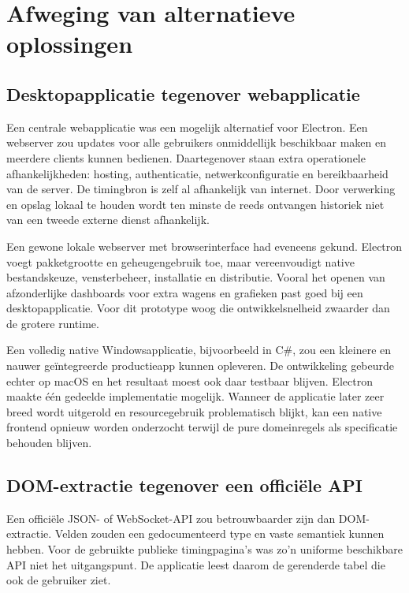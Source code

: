 
\chapter{Afweging van alternatieve oplossingen}
\label{chap:alternatieven}
\section{Desktopapplicatie tegenover webapplicatie}
Een centrale webapplicatie was een mogelijk alternatief voor Electron. Een webserver zou updates
voor alle gebruikers onmiddellijk beschikbaar maken en meerdere clients kunnen bedienen.
Daartegenover staan extra operationele afhankelijkheden: hosting, authenticatie, netwerkconfiguratie
en bereikbaarheid van de server. De timingbron is zelf al afhankelijk van internet. Door verwerking
en opslag lokaal te houden wordt ten minste de reeds ontvangen historiek niet van een tweede externe
dienst afhankelijk.

Een gewone lokale webserver met browserinterface had eveneens gekund. Electron voegt pakketgrootte
en geheugengebruik toe, maar vereenvoudigt native bestandskeuze, vensterbeheer, installatie en
distributie. Vooral het openen van afzonderlijke dashboards voor extra wagens en grafieken past goed
bij een desktopapplicatie. Voor dit prototype woog die ontwikkelsnelheid zwaarder dan de grotere
runtime.

Een volledig native Windowsapplicatie, bijvoorbeeld in C\#, zou een kleinere en nauwer geïntegreerde
productieapp kunnen opleveren. De ontwikkeling gebeurde echter op macOS en het resultaat moest ook
daar testbaar blijven. Electron maakte één gedeelde implementatie mogelijk. Wanneer de applicatie
later zeer breed wordt uitgerold en resourcegebruik problematisch blijkt, kan een native frontend
opnieuw worden onderzocht terwijl de pure domeinregels als specificatie behouden blijven.

\section{DOM-extractie tegenover een officiële API}
Een officiële JSON- of WebSocket-API zou betrouwbaarder zijn dan DOM-extractie. Velden zouden een
gedocumenteerd type en vaste semantiek kunnen hebben. Voor de gebruikte publieke timingpagina's was
zo'n uniforme beschikbare API niet het uitgangspunt. De applicatie leest daarom de gerenderde tabel
die ook de gebruiker ziet.

